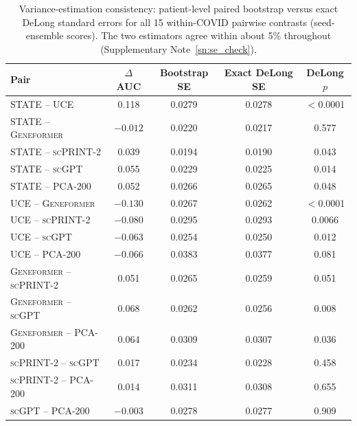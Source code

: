 \documentclass[11pt,a4paper]{article}
\newcommand{\model}[1]{\textsc{#1}}
\begin{document}
\begin{table}[t]
\centering
\caption{Variance-estimation consistency: patient-level paired bootstrap
versus exact DeLong standard errors for all 15 within-COVID pairwise
contrasts (seed-ensemble scores). The two estimators agree within about 5\%
throughout (Supplementary Note~\ref{sn:se_check}).}
\label{tab:se_check}
\small
\begin{tabular}{lcccc}
\toprule
\textbf{Pair} & \textbf{$\Delta$AUC} & \textbf{Bootstrap SE} & \textbf{Exact DeLong SE} & \textbf{DeLong $p$} \\
\midrule
\model{STATE} -- \model{UCE} & 0.118 & 0.0279 & 0.0278 & $<$0.0001 \\
\model{STATE} -- \model{Geneformer} & $-0.012$ & 0.0220 & 0.0217 & 0.577 \\
\model{STATE} -- \model{scPRINT-2} & 0.039 & 0.0194 & 0.0190 & 0.043 \\
\model{STATE} -- \model{scGPT} & 0.055 & 0.0229 & 0.0225 & 0.014 \\
\model{STATE} -- PCA-200 & 0.052 & 0.0266 & 0.0265 & 0.048 \\
\model{UCE} -- \model{Geneformer} & $-0.130$ & 0.0267 & 0.0262 & $<$0.0001 \\
\model{UCE} -- \model{scPRINT-2} & $-0.080$ & 0.0295 & 0.0293 & 0.0066 \\
\model{UCE} -- \model{scGPT} & $-0.063$ & 0.0254 & 0.0250 & 0.012 \\
\model{UCE} -- PCA-200 & $-0.066$ & 0.0383 & 0.0377 & 0.081 \\
\model{Geneformer} -- \model{scPRINT-2} & 0.051 & 0.0265 & 0.0259 & 0.051 \\
\model{Geneformer} -- \model{scGPT} & 0.068 & 0.0262 & 0.0256 & 0.008 \\
\model{Geneformer} -- PCA-200 & 0.064 & 0.0309 & 0.0307 & 0.036 \\
\model{scPRINT-2} -- \model{scGPT} & 0.017 & 0.0234 & 0.0228 & 0.458 \\
\model{scPRINT-2} -- PCA-200 & 0.014 & 0.0311 & 0.0308 & 0.655 \\
\model{scGPT} -- PCA-200 & $-0.003$ & 0.0278 & 0.0277 & 0.909 \\
\bottomrule
\end{tabular}
\end{table}
\end{document}
